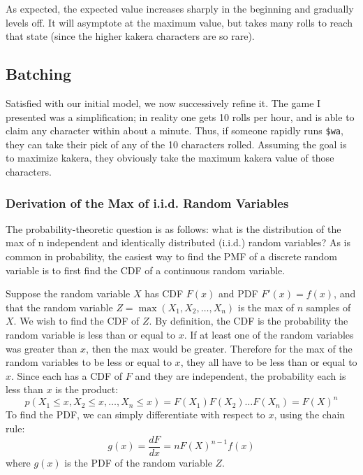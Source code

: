 \documentclass[11pt, oneside]{article}
\theoremstyle{plain}
\theoremstyle{definition}
\begin{document}
As expected, the expected value increases sharply in the beginning and
gradually levels off. It will asymptote at the maximum value, but takes many
rolls to reach that state (since the higher kakera characters are so rare).

\subsection{Batching}
Satisfied with our initial model, we now successively refine it. The
game I presented was a simplification; in reality one gets 10 rolls per
hour, and is able to claim any character within about a minute. Thus,
if someone rapidly runs \texttt{\$wa}, they can take their pick of any
of the 10 characters rolled. Assuming the goal is to maximize kakera,
they obviously take the maximum kakera value of those characters.

\subsubsection{Derivation of the Max of i.i.d. Random Variables}
The probability-theoretic question is as follows: what is the distribution of
the max of n independent and identically distributed (i.i.d.) random variables?
As is common in probability, the easiest way to find the PMF of a discrete
random variable is to first find the CDF of a continuous random variable.

Suppose the random variable \( X \) has CDF \( F(x) \) and PDF \( F'(x) =
f(x) \), and that the random variable \( Z = \max(X_1, X_2, \dots, X_n) \) is
the max of \( n \) samples of \( X \). We wish to find the CDF of \( Z \). By
definition, the CDF is the probability the random variable is less than or
equal to \( x \). If at least one of the random variables was greater than
\( x \), then the max would be greater. Therefore for the max of the random
variables to be less or equal to \( x \), they all have to be less than or
equal to \( x \). Since each has a CDF of \( F \) and they are independent,
the probability each is less than \( x \) is the product:
\[ p(X_1 \leq x, X_2 \leq x, \dots, X_n \leq x) =
  F(X_1) F(X_2) \dots F(X_n) = F(X)^n \]
To find the PDF, we can simply differentiate
with respect to \( x \), using the chain rule:
\[ g(x) = \frac{dF}{dx} = n F(X)^{n - 1} f(x) \]
where \( g(x) \) is the PDF of the random variable \( Z \).
\end{document}
